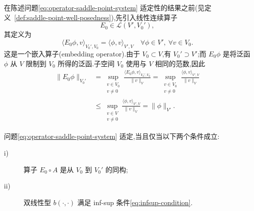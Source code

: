 \begin{note}[嵌入算子]\label{note:embedding-operator}
在陈述问题\cref{eq:operator-saddle-point-system} 适定性的结果之前(见定义~\ref{def:saddle-point-well-posedness}),先引入线性连续算子
\[
  E_0\in\mathcal{L}(V',V_0'),
\]
其定义为
\begin{equation}\label{eq:restriction-embedding}
  \langle E_0\phi,v\rangle_{V_0',V_0}
   =\langle\phi,v\rangle_{V',V}
  \quad\forall\phi\in V',\ \forall v\in V_0.
\end{equation}
这是一个嵌入算子(embedding operator).由于 $V_0\subset V$,有 $V_0'\supset V'$;而 $E_0\phi$ 是将泛函 $\phi$ 从 $V$ 限制到 $V_0$ 所得的泛函.子空间 $V_0$ 使用与 $V$ 相同的范数,因此
\begin{equation}\label{eq:embedding-norm-bound}
\begin{aligned}
  \|E_0\phi\|_{V_0'}
    &=\sup_{\substack{v\in V_0\\v\ne0}}
       \frac{\langle E_0\phi,v\rangle_{V_0',V_0}}{\|v\|_V}
     =\sup_{\substack{v\in V_0\\v\ne0}}
       \frac{\langle\phi,v\rangle_{V',V}}{\|v\|_V}\\
    &\le\sup_{\substack{v\in V\\v\ne0}}
       \frac{\langle\phi,v\rangle_{V',V}}{\|v\|_V}
     =\|\phi\|_{V'}.
\end{aligned}
\end{equation}
\end{note}

\begin{theorem}\label{thm:saddle-point-wellposedness}
问题\cref{eq:operator-saddle-point-system} 适定,当且仅当以下两个条件成立:
\begin{description}
  \item[i)] 算子 $E_0\circ A$ 是从 $V_0$ 到 $V_0'$ 的同构;
  \item[ii)] 双线性型 $b(\cdot,\cdot)$ 满足 inf-sup 条件\cref{eq:infsup-condition}.
\end{description}
\end{theorem}

